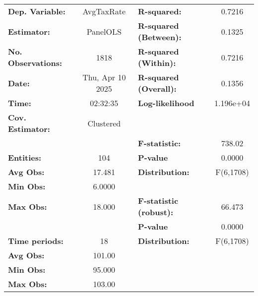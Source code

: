\begin{center}
\begin{tabular}{lclc}
\toprule
\textbf{Dep. Variable:}              &     AvgTaxRate     & \textbf{  R-squared:         }   &      0.7216      \\
\textbf{Estimator:}                  &      PanelOLS      & \textbf{  R-squared (Between):}  &      0.1325      \\
\textbf{No. Observations:}           &        1818        & \textbf{  R-squared (Within):}   &      0.7216      \\
\textbf{Date:}                       &  Thu, Apr 10 2025  & \textbf{  R-squared (Overall):}  &      0.1356      \\
\textbf{Time:}                       &      02:32:35      & \textbf{  Log-likelihood     }   &    1.196e+04     \\
\textbf{Cov. Estimator:}             &     Clustered      & \textbf{                     }   &                  \\
\textbf{}                            &                    & \textbf{  F-statistic:       }   &      738.02      \\
\textbf{Entities:}                   &        104         & \textbf{  P-value            }   &      0.0000      \\
\textbf{Avg Obs:}                    &       17.481       & \textbf{  Distribution:      }   &    F(6,1708)     \\
\textbf{Min Obs:}                    &       6.0000       & \textbf{                     }   &                  \\
\textbf{Max Obs:}                    &       18.000       & \textbf{  F-statistic (robust):} &      66.473      \\
\textbf{}                            &                    & \textbf{  P-value            }   &      0.0000      \\
\textbf{Time periods:}               &         18         & \textbf{  Distribution:      }   &    F(6,1708)     \\
\textbf{Avg Obs:}                    &       101.00       & \textbf{                     }   &                  \\
\textbf{Min Obs:}                    &       95.000       & \textbf{                     }   &                  \\
\textbf{Max Obs:}                    &       103.00       & \textbf{                     }   &                  \\

\end{tabular}
\end{center}
